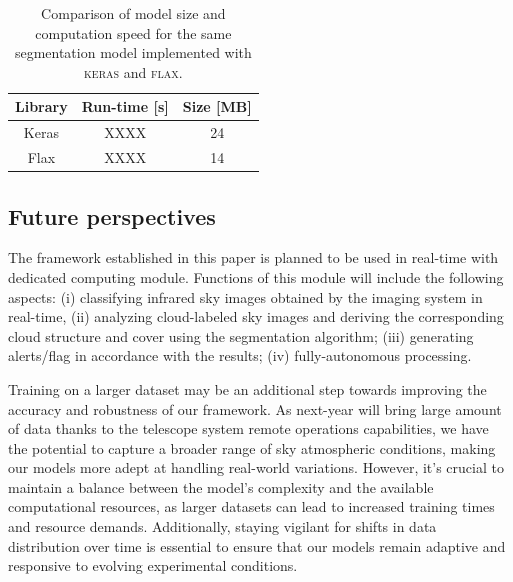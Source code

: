 \documentclass[amt, article]{copernicus}
\begin{document}
\begin{table}[t]
    \begin{center}
        \caption{Comparison of model size and computation speed for the same segmentation model implemented with \textsc{keras} and \textsc{flax}.}
        \begin{tabular}{c c c} 
        \tophline \hline
         Library & Run-time [s] & Size [MB]\\
         \hline
         Keras & XXXX & 24 \\ [1.0ex]
         Flax & XXXX & 14 \\ [1.0ex]
         \hline
        \end{tabular}
        \belowtable{}
        \end{center}
    \end{table}
    

\subsection{Future perspectives}

The framework established in this paper is planned to be used in real-time with dedicated computing module. Functions of this
module will include the following aspects: (i) classifying infrared sky images obtained by the imaging system in real-time, (ii) analyzing cloud-labeled sky images and deriving the corresponding cloud structure and cover using the segmentation algorithm; (iii) generating alerts/flag in accordance with the results; (iv) fully-autonomous processing.

Training on a larger dataset may be an additional step towards improving the accuracy and robustness of our framework. As next-year will bring large amount of data thanks to the telescope system remote operations capabilities, we have the potential to capture a broader range of sky atmospheric conditions, making our models more adept at handling real-world variations. However, it's crucial to maintain a balance between the model's complexity and the available computational resources, as larger datasets can lead to increased training times and resource demands. Additionally, staying vigilant for shifts in data distribution over time is essential to ensure that our models remain adaptive and responsive to evolving experimental conditions.

\conclusions[Conclusion]%
\label{sec:conclusion}
\end{document}
